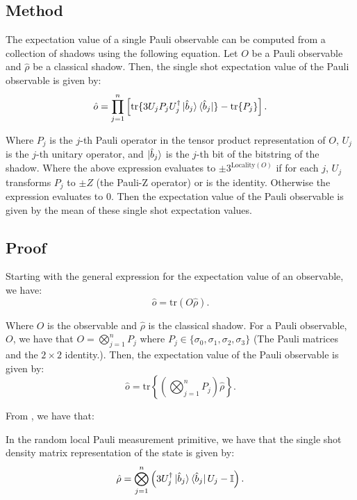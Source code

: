 \documentclass[12pt]{article}
\begin{document}
    \subsection{Method}
    The expectation value of a single Pauli observable can be computed from a collection of shadows using the following equation. Let $O$ be a Pauli observable and $\hat{\rho}$ be a classical shadow. Then, the single shot expectation value of the Pauli observable is given by:
    \begin{equation}
        \hat{o} = \prod_{j=1}^n \left[ \text{tr}\{ 3 U_jP_j U^\dagger_j \ket{\hat{b}_j}\bra{\hat{b}_j}\} - \text{tr}\{ P_j \} \right].
    \end{equation}

    Where $P_j$ is the $j$-th Pauli operator in the tensor product representation of $O$, $U_j$ is the $j$-th unitary operator, and $\ket{\hat{b}_j}$ is the $j$-th bit of the bitstring of the shadow. Where the above expression evaluates to $\pm3^{\text{Locality}(O)}$ if for each $j$, $U_j$ transforms $P_j$ to $\pm Z$ (the Pauli-Z operator) or is the identity. Otherwise the expression evaluates to 0. Then the expectation value of the Pauli observable is given by the mean of these single shot expectation values.
    
    \subsection{Proof}
    Starting with the general expression for the expectation value of an observable, we have:
    \begin{equation*}
        \hat{o} = \text{tr}(O\hat{\rho}).
    \end{equation*}
    
    Where $O$ is the observable and $\hat{\rho}$ is the classical shadow. For a Pauli observable, $O$, we have that $O = \bigotimes_{j=1}^n P_j$ where $P_j \in \{ \sigma_0, \sigma_1, \sigma_2, \sigma_3 \}$ (The Pauli matrices and the $2\times2$ identity.). Then, the expectation value of the Pauli observable is given by:
    \begin{equation*}
        \hat{o} = \text{tr}\left\{\left( \bigotimes_{j=1}^n P_j \right) \hat{\rho}\right\}.
    \end{equation*}

    From \cite{Huang_Kueng_Preskill_2020}, we have that:
    \begin{theorem}
        In the random local Pauli measurement primitive, we have that the single shot density matrix representation of the state is given by:
        \begin{equation}
            \hat{\rho} = \bigotimes^n_{j=1}\left(3U_j^\dagger\ket{\hat{b}_j}\bra{\hat{b}_j}U_j - \mathbb{I} \right).
        \end{equation}
    \end{theorem}
\end{document}
